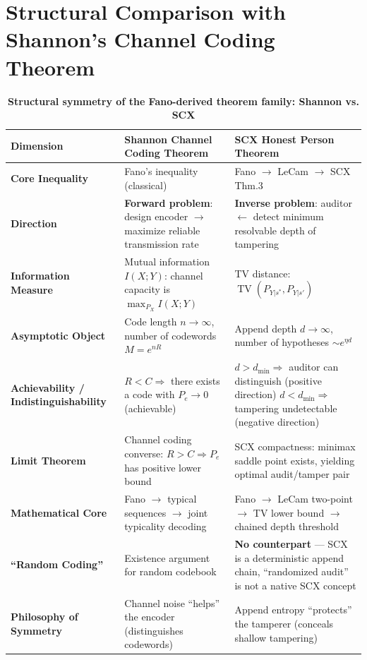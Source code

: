 \documentclass[12pt,a4paper]{article}
\theoremstyle{plain}
\theoremstyle{definition}
\DeclareMathOperator{\TV}{TV}
\begin{document}
\section{Structural Comparison with Shannon's Channel Coding Theorem}
\label{sec:shannon_comparison}

\begin{table}[h!]
\centering
\caption{\textbf{Structural symmetry of the Fano-derived theorem family: Shannon vs. SCX}}
\label{tab:comparison}
\renewcommand{\arraystretch}{1.8}
\begin{tabular}{@{}p{3.2cm} p{5.2cm} p{5.2cm}@{}}
\toprule
\textbf{Dimension} & \textbf{Shannon Channel Coding Theorem} & \textbf{SCX Honest Person Theorem} \\
\midrule
\textbf{Core Inequality} &
Fano's inequality (classical) &
Fano $\to$ LeCam $\to$ SCX Thm.3 \\
\midrule
\textbf{Direction} &
\textbf{Forward problem}: design encoder $\to$ maximize reliable transmission rate &
\textbf{Inverse problem}: auditor $\gets$ detect minimum resolvable depth of tampering \\
\midrule
\textbf{Information Measure} &
Mutual information $I(X;Y)$: channel capacity is $\max_{P_X} I(X;Y)$ &
TV distance: $\TV(P_{Y|s^*}, P_{Y|s'})$ \\
\midrule
\textbf{Asymptotic Object} &
Code length $n \to \infty$, number of codewords $M = e^{nR}$ &
Append depth $d \to \infty$, number of hypotheses $\sim e^{\eta d}$ \\
\midrule
\textbf{Achievability / Indistinguishability} &
$R < C \Rightarrow$ there exists a code with $P_e \to 0$ (achievable) &
$d > d_{\min} \Rightarrow$ auditor can distinguish (positive direction)
$d < d_{\min} \Rightarrow$ tampering undetectable (negative direction) \\
\midrule
\textbf{Limit Theorem} &
Channel coding converse: $R > C \Rightarrow P_e$ has positive lower bound &
SCX compactness: minimax saddle point exists, yielding optimal audit/tamper pair \\
\midrule
\textbf{Mathematical Core} &
Fano $\to$ typical sequences $\to$ joint typicality decoding &
Fano $\to$ LeCam two-point $\to$ TV lower bound $\to$ chained depth threshold \\
\midrule
\textbf{``Random Coding''} &
Existence argument for random codebook &
\textbf{No counterpart} --- SCX is a deterministic append chain,
``randomized audit'' is not a native SCX concept \\
\midrule
\textbf{Philosophy of Symmetry} &
Channel noise ``helps'' the encoder (distinguishes codewords) &
Append entropy ``protects'' the tamperer (conceals shallow tampering) \\
\bottomrule
\end{tabular}
\end{table}
\end{document}
